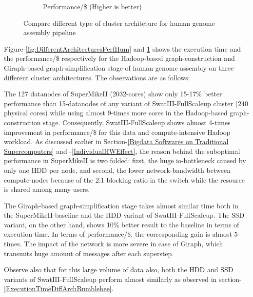 \documentclass[conference]{IEEEtran}
\begin{document}
\begin{figure}[htb]
\begin{subfigure}[b]{0.23\textwidth}
                \caption{Performance/\$ (Higher is better)}
                \label{fig:DifferentArchitecturesPerfPerDollarHum}
        \end{subfigure}
        \caption{Compare different type of cluster architeture for human genome assembly pipeline}
  \label{fig:DifferentArchitecturesHum}
\end{figure}  
Figure-\ref{fig:DifferentArchitecturesPerfHum} and \ref{fig:DifferentArchitecturesPerfPerDollarHum} shows the execution time and the performance/\$ respectively for the Hadoop-based graph-construction and Giraph-based graph-simplification stage of human genome assembly on three different cluster architectures.
The observations are as follows:
\begin{inparaenum}[\itshape 1\upshape)]
\item The 127 datanodes of SuperMikeII (2032-cores) show only 15-17\% better performance than 15-datanodes of any variant of SwatIII-FullScaleup cluster (240 physical cores) while using almost 9-times more cores in the Hadoop-based graph-construction stage. Consequently, SwatIII-FullScaleup shows almost 4-times improvement in performance/\$ for this data and compute-intensive Hadoop workload.
As discussed earlier in Section-\ref{Bigdata Softwares on Traditional Supercomputers} and -\ref{IndividualHWEffect}, the reason behind the suboptimal performance in SuperMikeII is two folded: first, the huge io-bottleneck caused by only one HDD per node, and second, the lower network-bandwidth between compute-nodes because of the 2:1 blocking ratio in the switch while the resource is shared among many users.
\item The Giraph-based graph-simplification stage takes almost similar time both in the SuperMikeII-baseline and the HDD variant of SwatIII-FullScaleup. The SSD variant, on the other hand, shows 10\% better result to the baseline in terms of execution time. In terms of performance/\$, the corresponding gain is almost 5-times. 
The impact of the network is more severe in case of Giraph, which transmits huge amount of messages after each superstep. 
\item Observe also that for this large volume of data also, both the HDD and SSD variants of SwatIII-FullScaleup perform almost similarly as observed in section-\ref{ExecutionTimeDiffArchBumblebee}.
\end{inparaenum}
\end{document}

